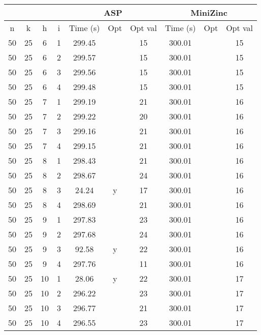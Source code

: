 \documentclass[12pt,a4paper,english,italian]{article}
\begin{document}
\begin{table}[]
	\begin{tabular}{cccc|ccc|ccc|}
		\cline{5-10}
		&    &    &   & \multicolumn{3}{c|}{ASP} & \multicolumn{3}{c|}{MiniZinc} \\ \hline
		n  & k  & h  & i & Time (s) & Opt & Opt val & Time (s)   & Opt   & Opt val  \\ \hline
		50 & 25 & 6  & 1 & 299.45   &     & 15      & 300.01     &       & 15       \\ \hline
		50 & 25 & 6  & 2 & 299.57   &     & 15      & 300.01     &       & 15       \\ \hline
		50 & 25 & 6  & 3 & 299.56   &     & 15      & 300.01     &       & 15       \\ \hline
		50 & 25 & 6  & 4 & 299.48   &     & 15      & 300.01     &       & 15       \\ \hline
		50 & 25 & 7  & 1 & 299.19   &     & 21      & 300.01     &       & 16       \\ \hline
		50 & 25 & 7  & 2 & 299.22   &     & 20      & 300.01     &       & 16       \\ \hline
		50 & 25 & 7  & 3 & 299.16   &     & 21      & 300.01     &       & 16       \\ \hline
		50 & 25 & 7  & 4 & 299.15   &     & 21      & 300.01     &       & 16       \\ \hline
		50 & 25 & 8  & 1 & 298.43   &     & 21      & 300.01     &       & 16       \\ \hline
		50 & 25 & 8  & 2 & 298.67   &     & 24      & 300.01     &       & 16       \\ \hline
		50 & 25 & 8  & 3 & 24.24    & y   & 17      & 300.01     &       & 16       \\ \hline
		50 & 25 & 8  & 4 & 298.69   &     & 21      & 300.01     &       & 16       \\ \hline
		50 & 25 & 9  & 1 & 297.83   &     & 23      & 300.01     &       & 16       \\ \hline
		50 & 25 & 9  & 2 & 297.68   &     & 24      & 300.01     &       & 16       \\ \hline
		50 & 25 & 9  & 3 & 92.58    & y   & 22      & 300.01     &       & 16       \\ \hline
		50 & 25 & 9  & 4 & 297.76   &     & 11      & 300.01     &       & 16       \\ \hline
		50 & 25 & 10 & 1 & 28.06    & y   & 22      & 300.01     &       & 17       \\ \hline
		50 & 25 & 10 & 2 & 296.22   &     & 23      & 300.01     &       & 17       \\ \hline
		50 & 25 & 10 & 3 & 296.77   &     & 21      & 300.01     &       & 17       \\ \hline
		50 & 25 & 10 & 4 & 296.55   &     & 23      & 300.01     &       & 17       \\ \hline
	\end{tabular}
\end{table}
\end{document}
